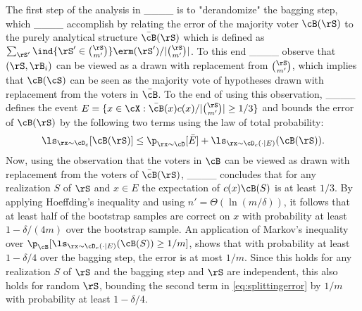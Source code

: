 The first step of the analysis in ____ is to "derandomize" the bagging step, which ____ accomplish by relating the error of the majority voter $\cB(\rS)$ to the purely analytical structure $\bar{\cB}(\rS)$ which is defined as $\sum_{\rS'} \ind\{\rS'\in \binom{\rS}{m'}\}\erm(\rS')/|\tbinom{\rS}{m'}|$. To this end ____ observe that $ (\rS,\rB_{i}) $ can be viewed as a drawn with replacement from $\tbinom{\rS}{m'}$, which implies that $ \cB(\cS) $ can be seen as the majority vote of hypotheses drawn with replacement from the voters in $ \bar{\cB} $. To the end of using this observation, ____ defines the event $E=\{ x\in \cX: \bar{\cB}(x)c(x)/|\binom{\rS}{m'}|\geq 1/3\}$ and bounds the error of $\cB(\rS)  $ by the following two terms using the law of total probability:
\begin{align}\label{eq:splittingerror}
  \vspace{-0.5cm}
 \ls_{\rx\sim\cD_{c}}[\cB(\rS) ] \leq \p_{\rx\sim\cD}[\bar{E}]+\ls_{\rx\sim\cD_{c}(\cdot \mid E)}(\cB(\rS)).
\end{align}
\vspace{-0.5cm}\newline
Now, using the observation that the voters in $ \cB $ can be viewed as drawn with replacement from the voters of $ \bar{\cB}(\rS) $, ____ concludes that for any realization $S$ of $\rS$ and $x\in E$ the expectation of $c(x)\cB(S)$ is at least $1/3$. By applying Hoeffding's inequality and using $ n'=\Theta(\ln{(m/\delta )})$, it follows that at least half of the bootstrap samples are correct on $x$ with probability at least $1-\delta/(4m)$ over the bootstrap sample. An application of Markov's inequality over $\p_{\cB}[\ls_{\rx\sim\cD_{c}(\cdot|E)}(\cB(S))\geq 1/m]$, shows that with probability at least $1-\delta/4$ over the bagging step, the error is at most $1/m$. Since this holds for any realization $S$ of $\rS$ and the bagging step and $\rS$ are independent, this also holds for random $ \rS $, bounding the second term in \cref{eq:splittingerror} by $ 1/m $ with probability at least $ 1-\delta/4 $. 

